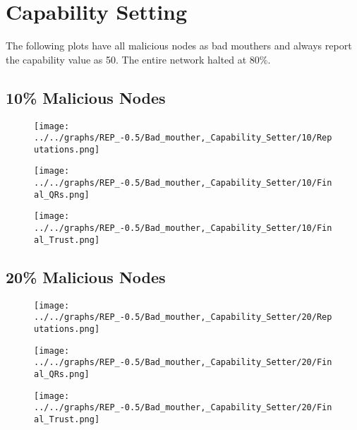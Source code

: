 \section*{Capability Setting}
The following plots have all malicious nodes as bad mouthers and always
report the capability value as 50. The entire network halted at 80\%.
\\
\begin{minipage}[t]{0.49\columnwidth}
\subsection*{10\% Malicious Nodes}
    \begin{figure}[H]
        \centering
        \texttt{[image: ../../graphs/REP\_-0.5/Bad\_mouther,\_Capability\_Setter/10/Reputations.png]}
    \end{figure}
    \begin{figure}[H]
        \centering
        \texttt{[image: ../../graphs/REP\_-0.5/Bad\_mouther,\_Capability\_Setter/10/Final\_QRs.png]}
    \end{figure}
\end{minipage}
\begin{minipage}[t]{0.49\columnwidth}
    \begin{figure}[H]
        \centering
        \texttt{[image: ../../graphs/REP\_-0.5/Bad\_mouther,\_Capability\_Setter/10/Final\_Trust.png]}
    \end{figure}
\end{minipage}

\begin{minipage}[t]{0.49\columnwidth}
\subsection*{20\% Malicious Nodes}
    \begin{figure}[H]
        \centering
        \texttt{[image: ../../graphs/REP\_-0.5/Bad\_mouther,\_Capability\_Setter/20/Reputations.png]}
    \end{figure}
    \begin{figure}[H]
        \centering
        \texttt{[image: ../../graphs/REP\_-0.5/Bad\_mouther,\_Capability\_Setter/20/Final\_QRs.png]}
    \end{figure}
\end{minipage}
\begin{minipage}[t]{0.49\columnwidth}
    \begin{figure}[H]
        \centering
        \texttt{[image: ../../graphs/REP\_-0.5/Bad\_mouther,\_Capability\_Setter/20/Final\_Trust.png]}
    \end{figure}
\end{minipage}

